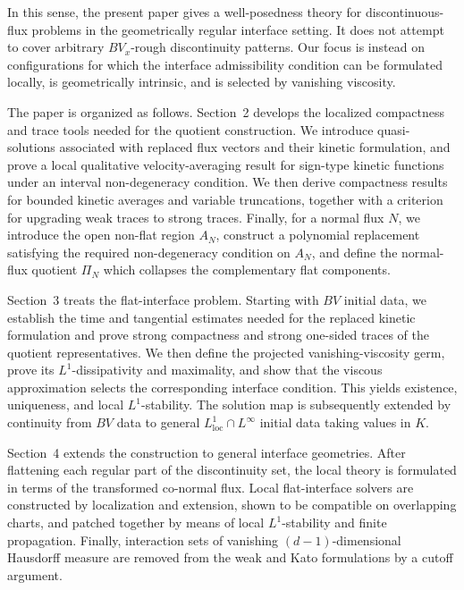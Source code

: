 \documentclass[11pt]{amsart}
\numberwithin{equation}{section}
\theoremstyle{plain}
\theoremstyle{definition}
\theoremstyle{remark}
\begin{document}
In this sense, the present paper gives a well-posedness theory for
discontinuous-flux problems in the geometrically regular interface setting.
It does not attempt to cover arbitrary \(BV_x\)-rough discontinuity patterns.
Our focus is instead on configurations for which the interface admissibility
condition can be formulated locally, is geometrically intrinsic, and is
selected by vanishing viscosity.


The paper is organized as follows. Section~2 develops the localized compactness
and trace tools needed for the quotient construction. We introduce
quasi-solutions associated with replaced flux vectors and their kinetic
formulation, and prove a local qualitative velocity-averaging result for
sign-type kinetic functions under an interval non-degeneracy condition. We
then derive compactness results for bounded kinetic averages and variable
truncations, together with a criterion for upgrading weak traces to strong
traces. Finally, for a normal flux \(N\), we introduce the open non-flat region
\(A_N\), construct a polynomial replacement satisfying the required
non-degeneracy condition on \(A_N\), and define the normal-flux quotient
\(\Pi_N\) which collapses the complementary flat components.

Section~3 treats the flat-interface problem. Starting with \(BV\) initial data,
we establish the time and tangential estimates needed for the replaced kinetic
formulation and prove strong compactness and strong one-sided traces of the
quotient representatives. We then define the projected vanishing-viscosity
germ, prove its \(L^1\)-dissipativity and maximality, and show that the viscous
approximation selects the corresponding interface condition. This yields
existence, uniqueness, and local \(L^1\)-stability. The solution map is
subsequently extended by continuity from \(BV\) data to general
\(L^1_{\mathrm{loc}}\cap L^\infty\) initial data taking values in \(K\).

Section~4 extends the construction to general interface geometries. After
flattening each regular part of the discontinuity set, the local theory is
formulated in terms of the transformed co-normal flux. Local flat-interface
solvers are constructed by localization and extension, shown to be compatible
on overlapping charts, and patched together by means of local
\(L^1\)-stability and finite propagation. Finally, interaction sets of
vanishing \((d-1)\)-dimensional Hausdorff measure are removed from the weak and
Kato formulations by a cutoff argument.

\end{document}
